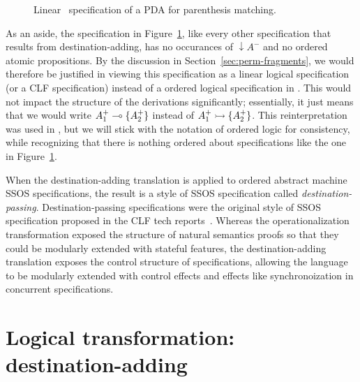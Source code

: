 \begin{figure}
\caption{Linear \sls~specification of a PDA for parenthesis matching.}
\label{fig:pda-lin}
\end{figure}

As an aside, the specification in Figure~\ref{fig:pda-lin}, like every
other specification that results from destination-adding, has no
occurances of ${\downarrow}A^-$ and no ordered atomic propositions. By
the discussion in Section~\ref{sec:perm-fragments}, we would therefore
be justified in viewing this specification as a linear logical
specification (or a CLF specification) instead of a ordered logical
specification in \sls.  This would not impact the structure of the
derivations significantly; essentially, it just means that we would
write $A^+_1 \multimap \{ A^+_2 \}$ instead of $A^+_1 \rightarrowtail \{ A^+_2
\}$.  This reinterpretation was used in \cite{simmons11logical}, but
we will stick with the notation of ordered logic for consistency,
while recognizing that there is nothing ordered
about specifications like the one in Figure~\ref{fig:pda-lin}. 

When the destination-adding translation is applied to ordered abstract
machine SSOS specifications, the result is a style of SSOS
specification called {\it destination-passing}. Destination-passing
specifications were the original style of SSOS specification proposed
in the CLF tech reports~\cite{cervesato02concurrent}. Whereas the
operationalization transformation exposed the structure of natural
semantics proofs so that they could be modularly extended with
stateful features, the destination-adding translation exposes the
control structure of specifications, allowing the language to be
modularly extended with control effects and effects like
synchronoization in concurrent specifications.

\section{Logical transformation: destination-adding}
\label{sec:destination-adding}

